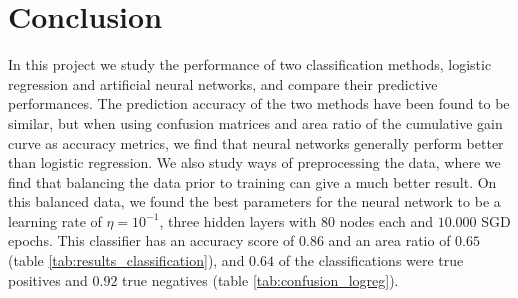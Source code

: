 \section{Conclusion}\label{sec:Conclusion}
In this project we study the performance of two classification methods, logistic regression and artificial neural networks, and compare their predictive performances. The prediction accuracy of the two methods have been found to be similar, but when using confusion matrices and area ratio of the cumulative gain curve as accuracy metrics, we find that neural networks generally perform better than logistic regression. We also study ways of preprocessing the data, where we find that balancing the data prior to training can give a much better result. On this balanced data, we found the best parameters for the neural network to be a learning rate of $\eta=10^{-1}$, three hidden layers with $80$ nodes each and $10.000$ SGD epochs. This classifier has an accuracy score of $0.86$ and an area ratio of $0.65$ (table \ref{tab:results_classification}), and $0.64$ of the classifications were true positives and $0.92$ true negatives (table \ref{tab:confusion_logreg}).